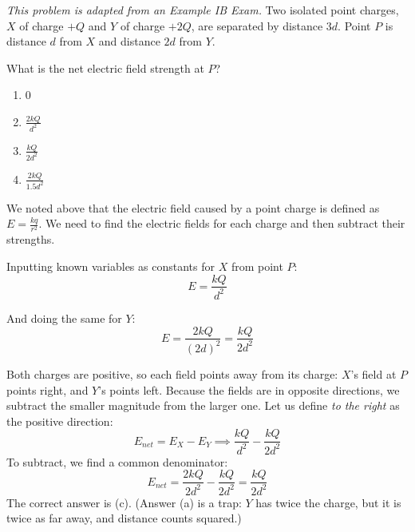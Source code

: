 \begin{Exercise}[title={Point Charges and Electric Fields}, label={ex:ef}]
	\textit{This problem is adapted from an Example IB Exam.}
	Two isolated point charges, $X$ of charge $+Q$ and $Y$ of charge $+2Q$, are separated by distance $3d$. Point $P$ is distance $d$ from $X$ and distance $2d$ from $Y$.



	What is the net electric field strength at $P$?

	\begin{enumerate}
		\item $0$
		\item $\frac{2kQ}{d^2}$
		\item $\frac{kQ}{2d^2}$
		\item $\frac{2kQ}{1.5d^2}$
	\end{enumerate}
\end{Exercise}
\begin{Answer}[ref={ex:ef}]
	We noted above that the electric field caused by a point charge is defined as $E = \frac{kq}{r^2}$. We need to find the electric fields for each charge and then subtract their strengths.

	Inputting known variables as constants for $X$ from point $P$:
	$$E = \frac{kQ}{d^2}$$

	And doing the same for $Y$:
	$$E = \frac{2kQ}{(2d)^2} = \frac{kQ}{2d^2}$$

	Both charges are positive, so each field points away from its charge:
	$X$'s field at $P$ points right, and $Y$'s points left. Because the fields are in opposite directions, we subtract the smaller magnitude from the larger one. Let us define \textit{to the right} as the positive direction:
	$$E_{net} = E_X - E_Y \implies \frac{kQ}{d^2} - \frac{kQ}{2d^2}$$
	To subtract, we find a common denominator:
	$$E_{net} = \frac{2kQ}{2d^2} - \frac{kQ}{2d^2} = \frac{kQ}{2d^2}$$
	The correct answer is (c). (Answer (a) is a trap: $Y$ has twice the
	charge, but it is twice as far away, and distance counts squared.)
\end{Answer}


